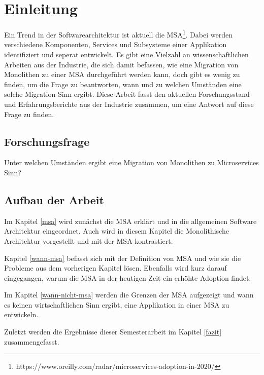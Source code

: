 \newpage
\section{Einleitung} \label{Einleitung}

Ein Trend in der Softwarearchitektur ist aktuell die
\ac{MSA}\footnote{https://www.oreilly.com/radar/microservices-adoption-in-2020/}.
Dabei werden verschiedene Komponenten, Services und Subsysteme einer Applikation
identifiziert und seperat entwickelt. Es gibt eine Vielzahl an
wissenschaftlichen Arbeiten aus der Industrie, die sich damit befassen, wie eine
Migration von Monolithen zu einer MSA durchgeführt werden kann, doch gibt es
wenig zu finden, um die Frage zu beantworten, wann und zu welchen Umständen eine
solche Migration Sinn ergibt. Diese Arbeit fasst den aktuellen Forschungsstand
und Erfahrungsberichte aus der Industrie zusammen, um eine Antwort auf diese
Frage zu finden.

\subsection{Forschungsfrage}
Unter welchen Umständen ergibt eine Migration von Monolithen zu Microservices Sinn?

\subsection{Aufbau der Arbeit}
Im Kapitel \ref{msa} wird zunächst die MSA erklärt und in die allgemeinen
Software Architektur eingeordnet. Auch wird in diesem Kapitel die Monolithische
Architektur vorgestellt und mit der MSA kontrastiert.

Kapitel \ref{wann-msa} befasst sich mit der Definition von MSA und wie
sie die Probleme aus dem vorherigen Kapitel lösen. Ebenfalls wird kurz darauf
eingegangen, warum die MSA in der heutigen Zeit ein erhöhte Adoption findet.

Im Kapitel \ref{wann-nicht-msa} werden die Grenzen der MSA aufgezeigt und wann
es keinen wirtschaftlichen Sinn ergibt, eine Applikation in einer MSA zu entwickeln.

Zuletzt werden die Ergebnisse dieser Semesterarbeit im Kapitel \ref{fazit}
zusammengefasst.
